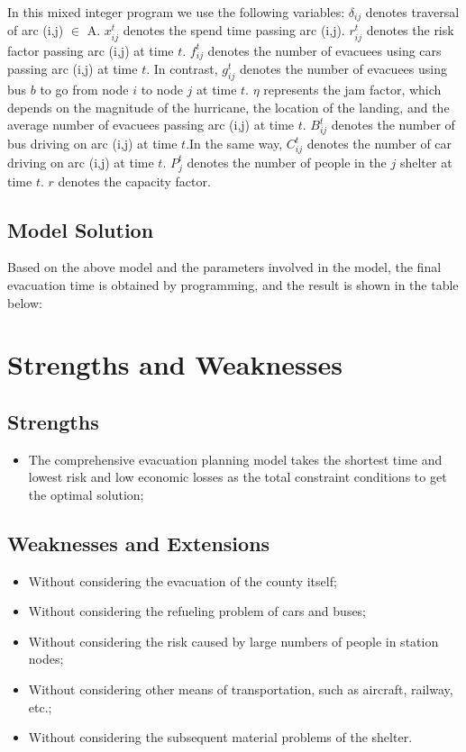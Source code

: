 \documentclass{mcmthesis}
\begin{document}
In this mixed integer program we use the following variables: $\delta _{ij}$ denotes traversal of arc (i,j) $ \in $ A. $x_{ij}^t$ denotes the spend time passing arc (i,j). $r_{ij}^t$ denotes the risk factor passing arc (i,j) at time $t$. $f_{ij}^t$ denotes the number of evacuees using cars passing arc (i,j) at time $t$. In contrast, $g_{ij}^t$ denotes the number of evacuees using bus $b$ to go from node $i$ to node $j$ at time $t$. $\eta $ represents the jam factor, which depends on the magnitude of the hurricane, the location of the landing, and the average number of evacuees passing arc (i,j) at time $t$. $B_{ij}^t$ denotes the number of bus driving on arc (i,j) at time $t$.In the same way, $C_{ij}^t$ denotes the number of car driving on arc (i,j) at time $t$. $P_j^t$  denotes the number of people in the $j$ shelter at time $t$. $r$ denotes the capacity factor.


\subsection{Model Solution}
Based on the above model and the parameters involved in the model, the final evacuation time is obtained by programming, and the result is shown in the table below:


\section{Strengths and Weaknesses}

\subsection{Strengths}

\begin{itemize}
  \item The comprehensive evacuation planning model takes the shortest time and lowest risk and low economic losses as the total constraint conditions to get the optimal solution;
\end{itemize}

\subsection{Weaknesses and Extensions}
\begin{itemize}
  \item Without considering the evacuation of the county itself;
  \item Without considering the refueling problem of cars and buses;
  \item Without considering the risk caused by large numbers of people in station nodes;
  \item Without considering other means of transportation, such as aircraft, railway, etc.;
  \item Without considering the subsequent material problems of the shelter.
\end{itemize}
\end{document}
